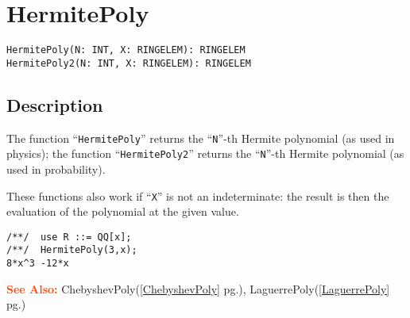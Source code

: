\documentclass[a4paper]{mybook}
\newenvironment{command}{}{} %
\newcommand\SeeAlso{\par\textcolor{OrangeRed}{\textbf{\large See Also: }}}
\begin{document}
\section{HermitePoly}
\label{HermitePoly}
\begin{command} %


\begin{Verbatim}[label=syntax, rulecolor=\color{MidnightBlue},
frame=single]
HermitePoly(N: INT, X: RINGELEM): RINGELEM
HermitePoly2(N: INT, X: RINGELEM): RINGELEM
\end{Verbatim}


\subsection*{Description}

The function ``\verb&HermitePoly&'' returns the ``\verb&N&''-th Hermite polynomial (as used
in physics); the function ``\verb&HermitePoly2&'' returns the ``\verb&N&''-th Hermite
polynomial (as used in probability).
\par 
These functions also work if ``\verb&X&'' is not an indeterminate: the result
is then the evaluation of the polynomial at the given value.
\begin{Verbatim}[label=example, rulecolor=\color{PineGreen}, frame=single]
/**/  use R ::= QQ[x];
/**/  HermitePoly(3,x);
8*x^3 -12*x
\end{Verbatim}


\SeeAlso %
  ChebyshevPoly(\ref{ChebyshevPoly} pg.\pageref{ChebyshevPoly}), 
    LaguerrePoly(\ref{LaguerrePoly} pg.\pageref{LaguerrePoly})
\end{command} %
\end{document}
